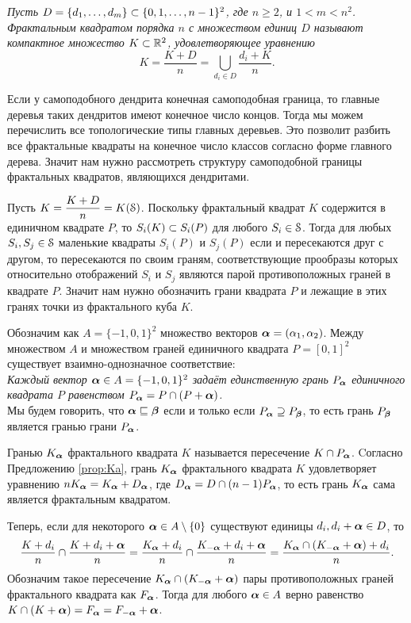 {\em Пусть $D=\{d_1,\ldots,d_m\}\subset\{0,1,\ldots,n-1\}^2$, где $n\ge 2$, и $1<m<n^2$. 
{\em Фрактальным квадратом} порядка $n$ с {\em множеством единиц $D$} называют компактное множество $K\subset\mathbb{R}^2$, удовлетворяющее уравнению
$$K=\dfrac{K+D}{n}=\bigcup_{d_i\in D}\dfrac{d_i+K}{n}.$$}

Если у самоподобного дендрита конечная самоподобная граница, то главные деревья таких дендритов имеют конечное число концов.
Тогда мы можем перечислить все топологические типы главных деревьев.
Это позволит разбить все фрактальные квадраты на конечное число классов согласно форме главного дерева.
Значит нам нужно рассмотреть структуру самоподобной границы фрактальных квадратов, являющихся дендритами.

Пусть $K=\dfrac{K+D}{n}=K({\EuScript S})$.
Поскольку фрактальный квадрат $K$ содержится в единичном квадрате $P$, то $S_i(K)\subset S_i(P)$ для любого $S_i\in{\EuScript S}$.
Тогда для любых $S_i, S_j\in{\EuScript S}$ маленькие квадраты $S_i(P)$ и $S_j(P)$ если и пересекаются друг с другом, то пересекаются по своим граням, соответствующие прообразы которых относительно отображений $S_i$ и $S_j$ являются парой противоположных граней в квадрате $P$.
Значит нам нужно обозначить грани квадрата $P$ и лежащие в этих гранях точки из фрактального куба $K$.

Обозначим как $A=\{-1,0,1\}^2$ множество векторов ${\bm{\alpha}}=(\alpha_1,\alpha_2)$.
Между множеством $A$ и множеством граней единичного квадрата $P=[0,1]^2$ существует взаимно-однозначное соответствие:\\

{\em Каждый вектор ${\bm{\alpha}}\in A=\{-1,0,1\}^2$ задаёт единственную грань $P_{\bm{\alpha}}$ единичного квадрата $P$ равенством $P_{\bm{\alpha}}=P\cap(P+{\bm{\alpha}})$.}\\

Мы будем говорить, что ${\bm{\alpha}}\sqsubseteq{\bm{\beta}}$ если и только если $P_{\bm{\alpha}}\supseteq P_{\bm{\beta}}$, то есть грань $P_{\bm{\beta}}$ является гранью грани $P_{\bm{\alpha}}$.

Гранью $K_{\bm{\alpha}}$ фрактального квадрата $K$ называется пересечение $K\cap P_{\bm{\alpha}}$.
Cогласно Предложению \ref{prop:Ka}, грань $K_{\bm{\alpha}}$ фрактального квадрата $K$ удовлетворяет уравнению $n K_{\bm{\alpha}}=K_{\bm{\alpha}}+D_{\bm{\alpha}}$, где $D_{\bm{\alpha}}=D\cap(n-1)P_{\bm{\alpha}}$, то есть грань $K_{\bm{\alpha}}$ сама является фрактальным квадратом.

Теперь, если для некоторого ${\bm{\alpha}}\in A\setminus\{0\}$ существуют единицы $d_i,d_i+{\bm{\alpha}}\in D$, то
$$\dfrac{K+d_i}{n}\cap\dfrac{K+d_i+{\bm{\alpha}}}{n}=\dfrac{K_{\bm{\alpha}}+d_i}{n}\cap\dfrac{K_{-{\bm{\alpha}}}+d_i+{\bm{\alpha}}}{n}=\dfrac{K_{\bm{\alpha}}\cap(K_{-{\bm{\alpha}}}+{\bm{\alpha}})+d_i}{n}.$$
Обозначим такое пересечение $K_{\bm{\alpha}}\cap(K_{-{\bm{\alpha}}}+{\bm{\alpha}})$ пары противоположных граней фрактального квадрата как $F_{\bm{\alpha}}$.
Тогда для любого ${\bm{\alpha}}\in A$ верно равенство $K\cap(K+{\bm{\alpha}})=F_{\bm{\alpha}}=F_{-{\bm{\alpha}}}+{\bm{\alpha}} $.


